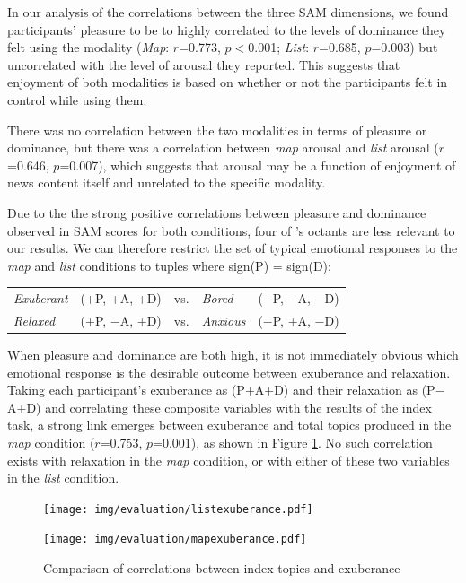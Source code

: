 In our analysis of the correlations between the three SAM dimensions, we found participants' pleasure to be to highly correlated to the levels of dominance they felt using the modality (\textit{Map}: $r$=0.773, $p<$0.001; \textit{List}: $r$=0.685, $p$=0.003) but uncorrelated with the level of arousal they reported. This suggests that enjoyment of both modalities is based on whether or not the participants felt in control while using them.

There was no correlation between the two modalities in terms of pleasure or dominance, but there was a correlation between \textit{map} arousal and \textit{list} arousal ($r$=0.646, $p$=0.007), which suggests that arousal may be a function of enjoyment of news content itself and unrelated to the specific modality.

Due to the the strong positive correlations between pleasure and dominance observed in SAM scores for both conditions, four of \citeauthor{emotionbasedtheory}'s octants are less relevant to our results. We can therefore restrict the set of typical emotional responses to the \textit{map} and \textit{list} conditions to tuples where sign(P) = sign(D):

\begin{table}[htbp!]
\centering
\begin{tabular}{lllll}
\textit{Exuberant} & (+P, +A, +D) & vs. & \textit{Bored} & ($-$P, $-$A, $-$D) \\
\textit{Relaxed} & (+P, $-$A, +D) & vs. & \textit{Anxious} & ($-$P, +A, $-$D) \\
\end{tabular}
\end{table}

When pleasure and dominance are both high, it is not immediately obvious which emotional response is the desirable outcome between exuberance and relaxation. Taking each participant's exuberance as (P+A+D) and their relaxation as (P$-$A+D) and correlating these composite variables with the results of the index task, a strong link emerges between exuberance and total topics produced in the \textit{map} condition ($r$=0.753, $p$=0.001), as shown in Figure \ref{fig:exuberance}. No such correlation exists with relaxation in the \textit{map} condition, or with either of these two variables in the \textit{list} condition.

\begin{figure}[h]
\centering
\begin{minipage}{.5\textwidth}
  \centering
  \texttt{[image: img/evaluation/listexuberance.pdf]}
  \end{minipage}%
\begin{minipage}{.5\textwidth}
  \centering
  \texttt{[image: img/evaluation/mapexuberance.pdf]}
\end{minipage}
	\caption{Comparison of correlations between index topics and exuberance}
  \label{fig:exuberance}
\end{figure}

